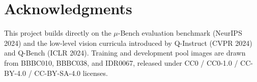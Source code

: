 \documentclass[11pt]{article}
\begin{document}
\section*{Acknowledgments}
This project builds directly on the $\mu$-Bench evaluation benchmark (NeurIPS 2024) and
the low-level vision curricula introduced by Q-Instruct (CVPR 2024) and Q-Bench (ICLR
2024). Training and development pool images are drawn from BBBC010, BBBC038, and
IDR0067, released under CC0 / CC0-1.0 / CC-BY-4.0 / CC-BY-SA-4.0 licenses.
\end{document}

